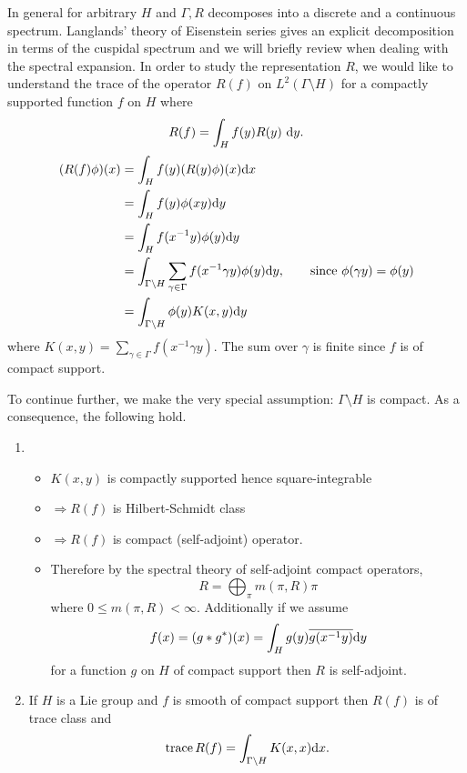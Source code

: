 \documentclass{ims9x6}
\def\d{\text d}
\def\bs{\setminus}
\def\Ltwo{L^2}
\def\trace{\operatorname{trace}}
\begin{document}
In general for arbitrary $H$ and $\Gamma, R$ decomposes into a discrete and a continuous spectrum. Langlands' theory of Eisenstein series gives an explicit decomposition in terms of the cuspidal spectrum and we will briefly review when dealing with the spectral expansion. In order to study the representation $R$, we would like to understand the trace of the operator $R(f)$ on $\Ltwo(\Gamma\bs H)$ for a compactly supported function $f$ on $H$ where
\[ R(f) = \int_H f(y) R(y)\ \d y. \]
\begin{align*}
	(R(f)\phi)(x) & = \int_H f(y) (R(y)\phi)(x) \d x \\
			& = \int_H f(y) \phi(xy) \d y \\
			& = \int_H f(x^{-1} y) \phi(y) \d y \\
			& = \int_{\Gamma\bs H} \sum_{\gamma \in \Gamma} f(x^{-1}\gamma y) \phi(y) \d y, \qquad \text{since } \phi(\gamma y) = \phi(y)\\
			& = \int_{\Gamma\bs H} \phi(y) K(x, y) \d y
\end{align*}
where $K(x, y) = \sum_{\gamma \in \Gamma} f(x^{-1}\gamma y)$. The sum over $\gamma$ is finite since $f$ is of compact support. 

To continue further, we make the very special assumption: $\Gamma\bs H$ is compact. As a consequence, the following hold.
\begin{enumerate}
\item 	\begin{itemize}
		\item[] $K(x, y)$ is compactly supported hence square-integrable
		\item[] $\Rightarrow R(f)$ is Hilbert-Schmidt class
		\item[] $\Rightarrow R(f)$ is compact (self-adjoint) operator. 
		\item[] Therefore by the spectral theory of self-adjoint compact operators,
			\[ R = \bigoplus_\pi m(\pi, R) \pi \]
			where $0 \leq m(\pi, R) < \infty$. Additionally if we assume 
			\[ f(x) = (g*g^*)(x) = \int_H g(y) \overline{g(x^{-1}y)} \d y \]
			for a function $g$ on $H$ of compact support then $R$ is self-adjoint. 
		\end{itemize}
\item If $H$ is a Lie group and $f$ is smooth of compact support then $R(f)$ is of trace class and
	\[ \trace R(f) = \int_{\Gamma\bs H} K(x, x) \d x. \]
\end{enumerate}
\end{document}
